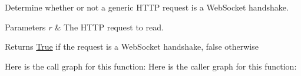 Determine whether or not a generic H\+T\+TP request is a Web\+Socket handshake. 


\begin{DoxyParams}{Parameters}
{\em r} & The H\+T\+TP request to read.\\
\hline
\end{DoxyParams}
\begin{DoxyReturn}{Returns}
\mbox{\hyperlink{struct_true}{True}} if the request is a Web\+Socket handshake, false otherwise 
\end{DoxyReturn}
Here is the call graph for this function\+:
Here is the caller graph for this function\+:
